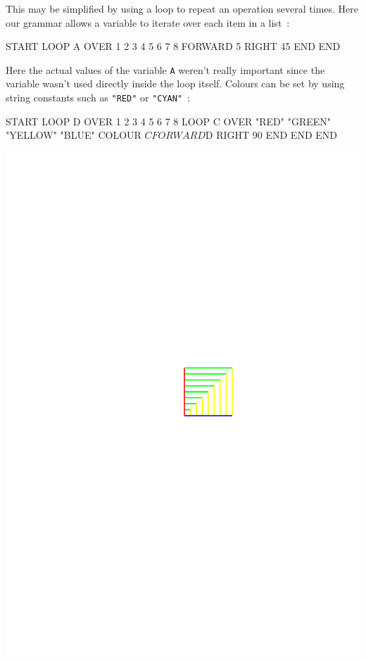 \noindent This may be simplified by using a loop to repeat an operation
several times.  Here our grammar allows a variable to iterate over each
item in a list~:

\begin{codesnippet}
START
  LOOP A OVER { 1 2 3 4 5 6 7 8 }
    FORWARD 5
    RIGHT 45
  END
END
\end{codesnippet}

Here the actual values of the variable \verb^A^ weren't really important since
the variable wasn't used directly inside the loop itself.
Colours can be set by using string constants such as \verb^"RED"^ or \verb^"CYAN"^~:

\begin{codesnippet}
START
  LOOP D OVER { 1 2 3 4 5 6 7 8 }
    LOOP C OVER { "RED" "GREEN" "YELLOW" "BLUE" }
      COLOUR $C
      FORWARD $D
      RIGHT 90
    END
  END
END
\end{codesnippet}
\begin{center}
\includegraphics[clip,trim=10cm 11cm 6cm 11cm,scale=1.25]{../Pictures/out_tunnel.pdf}
\end{center}

